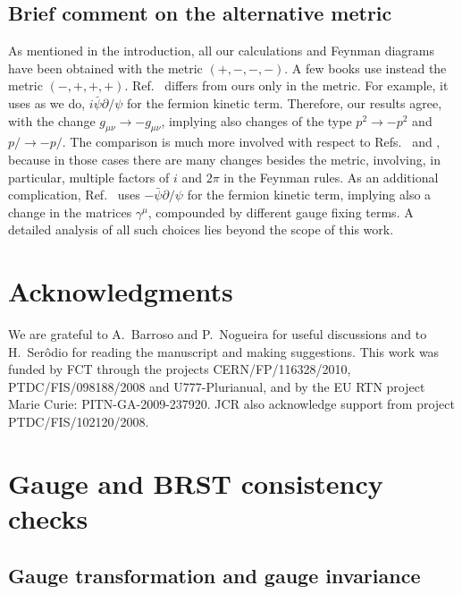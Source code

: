 \documentclass{ws-ijmpa}
\def\slash#1{#1\!\!\! /}
\begin{document}

\subsection{Brief comment on the alternative metric}

As mentioned in the introduction,
all our calculations and Feynman diagrams have
been obtained with the metric $(+,-,-,-)$.
A few books use instead the metric $(-,+,+,+)$.
Ref.~ differs from ours
only in the metric.
For example,
it uses as we do,
$i \bar{\psi} \slash{\partial} \psi$ for the fermion kinetic term.
Therefore,
our results agree,
with the change $g_{\mu \nu} \rightarrow - g_{\mu \nu}$,
implying also changes of the type
$p^2 \rightarrow - p^2$ and $\slash{p} \rightarrow - \slash{p}$.
The comparison is much more involved with respect
to Refs.~ and ,
because in those cases there are many changes
besides the metric,
involving,
in particular,
multiple factors of $i$ and $2 \pi$ in the Feynman rules.
As an additional complication,
Ref.~ uses
$- \bar{\psi} \slash{\partial} \psi$ for the fermion kinetic term,
implying also a change in the matrices $\gamma^\mu$,
compounded by different gauge fixing terms.
A detailed analysis of all such choices lies
beyond the scope of this work.




\section*{Acknowledgments}

We are grateful to A.~Barroso and P.~Nogueira for useful
discussions and to H.~Ser\^{o}dio for reading the manuscript
and making suggestions.
This work was funded by FCT through the projects
CERN/FP/116328/2010, PTDC/FIS/098188/2008 and U777-Plurianual,
and by the EU RTN project Marie Curie: PITN-GA-2009-237920. JCR also
acknowledge support from project PTDC/FIS/102120/2008.
\appendix

\section{\label{app:BRST}Gauge and BRST consistency checks}

\subsection{Gauge transformation and gauge invariance}
\end{document}

